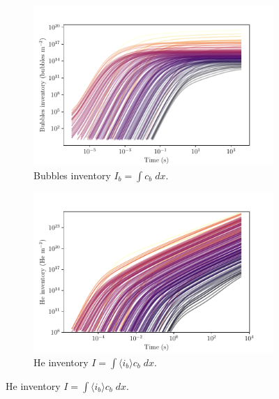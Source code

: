 \begin{figure} [ht!]
    \centering
    \begin{subfigure}{0.5\linewidth}
        \centering
        \includegraphics[width=\linewidth]{Figures/Chapter4/parametric study/total_bubbles_time.pdf}
        \caption{Bubbles inventory $I_b = \int c_b \; dx$.}
        \label{fig: inventory bubbles time}
    \end{subfigure}%
    \begin{subfigure}{0.5\linewidth}
        \centering
        \includegraphics[width=\linewidth]{Figures/Chapter4/parametric study/inventory_time.pdf}
        \caption{He inventory $I = \int \langle i_b \rangle c_b \; dx$.}
        \label{fig: He inventory time}
    \end{subfigure}

\end{figure}
